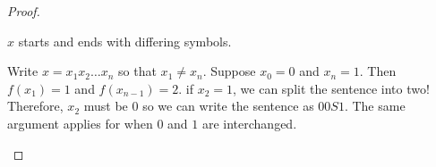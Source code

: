 \begin{problem}
\begin{enumalph}
\begin{Answer}
\begin{claim}
\begin{proof}
\begin{enumroman}
\begin{itemize}
                \end{itemize}
                
              \item $x$ starts and ends with differing symbols.

                \step
                Write $x = x_1x_2 \ldots x_n$ so that $x_1 \neq x_n$.
                Suppose $x_0 = 0$ and $x_n = 1$.
                Then $f(x_1) = 1$ and $f(x_{n-1}) = 2$.
                if $x_2 = 1$, we can split the sentence into two!
                Therefore, $x_2$ must be $0$ so we can write the sentence as $00S1$.
                The same argument applies for when $0$ and $1$ are interchanged.
            \end{enumroman}
          \end{proof}
        \end{claim}
      \end{Answer}
  \end{enumalph}
\end{problem}
